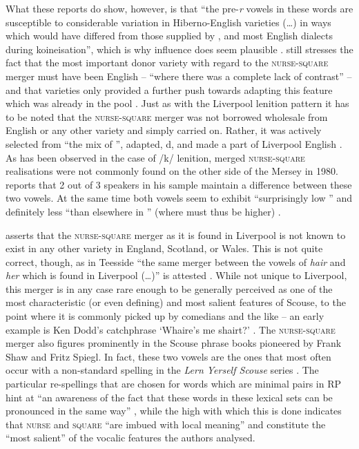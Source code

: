 What these reports do show, however, is that ``the pre-\emph{r} vowels in these words are susceptible to considerable variation in Hiberno-English varieties (\ldots) in ways which would have differed from those supplied by ,  and most English dialects during koineisation'', which is why  influence does seem plausible \citep[128]{honeybone2007}.
\textcite{honeybone2007} still stresses the fact that the most important donor variety with regard to the \textsc{nurse}-\textsc{square} merger must have been  English -- ``where there was a complete lack of contrast'' -- and that  varieties only provided a further push towards adapting this feature which was already in the pool \citep[129]{honeybone2007}.
Just as with the Liverpool lenition pattern it has to be noted that the \textsc{nurse}-\textsc{square} merger was not borrowed wholesale from  English or any other variety and simply carried on. 
Rather, it was actively selected from ``the mix of '', adapted, d, and made a part of Liverpool English \parencite[cf.][129]{honeybone2007}.
As has been observed in the case of /k/ lenition, merged \textsc{nurse}-\textsc{square} realisations were not commonly found on the other side of the Mersey in 1980.
\textcite[95]{newbrook1999} reports that 2 out of 3 speakers in his sample maintain a difference between these two vowels.
At the same time both vowels seem to exhibit ``surprisingly low '' and definitely less ``than elsewhere in '' (where  must thus be higher) \parencite[95]{newbrook1999}.

\citet[cf.][128]{honeybone2007} asserts that the \textsc{nurse}-\textsc{square} merger as it is found in Liverpool is not known to exist in any other variety in England, Scotland, or Wales.
This is not quite correct, though, as in Teesside ``the same merger between the vowels of \emph{hair} and \emph{her} which is found in Liverpool (\dots)'' is attested \parencite[70]{trudgill1999}.
While not unique to Liverpool, this merger is in any case rare enough to be generally perceived as one of the most characteristic (or even defining) and most salient features of Scouse, to the point where it is commonly picked up by comedians and the like -- an early example is Ken Dodd's catchphrase `Whaire's me shairt?' \citep[cf.][73]{trudgill1999}.
The \textsc{nurse}-\textsc{square} merger also figures prominently in the Scouse phrase books pioneered by Frank Shaw and Fritz Spiegl.
In fact, these two vowels are the ones that most often occur with a non-standard spelling in the \emph{Lern Yerself Scouse} series \parencite[cf.][322]{honeybonewatson2013}.
The particular re-spellings that are chosen for words which are minimal pairs in RP hint at ``an awareness of the fact that these words in these lexical sets can be pronounced in the same way'' \parencite[324]{honeybonewatson2013}, while the high  with which this is done indicates that \textsc{nurse} and \textsc{square} ``are imbued with local meaning'' and constitute the ``most salient'' of the vocalic features the authors analysed.

